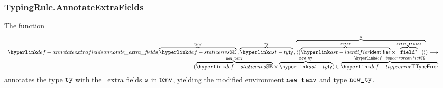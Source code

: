 \subsubsection{TypingRule.AnnotateExtraFields \label{sec:TypingRule.AnnotateExtraFields}}
\hypertarget{def-annotateextrafields}{}
The function
\[
\begin{array}{r}
\annotateextrafields(\overname{\staticenvs}{\tenv} \aslsep
  \overname{\ty}{\tty} \aslsep
  \overname{\langle(\overname{\identifier}{\vsuper}\times\overname{\field^*}{\extrafields})\rangle}{\vs}
)
\aslto \\
(\overname{\staticenvs}{\newtenv} \times \overname{\ty}{\newty})
\cup \overname{\TTypeError}{\TypeErrorConfig}
\end{array}
\]
annotates the type $\texttt{ty}$ with the \optional\ extra fields $\texttt{s}$ in $\textsf{tenv}$, yielding
the modified environment $\texttt{new\_tenv}$ and type $\texttt{new\_ty}$.
\ProseOtherwiseTypeError

